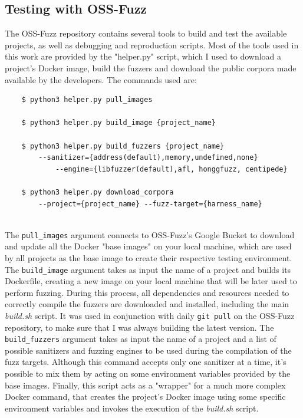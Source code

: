 \subsection{Testing with OSS-Fuzz}
The OSS-Fuzz repository contains several tools to build and test the available projects, as well as debugging and reproduction scripts.
\newline
Most of the tools used in this work are provided by the "helper.py" script, which I used to download a project's Docker image, build the fuzzers and download the public corpora made available by the developers.
\newline \newline
The commands used are:
\begin{verbatim}
    $ python3 helper.py pull_images 

    $ python3 helper.py build_image {project_name}

    $ python3 helper.py build_fuzzers {project_name}
        --sanitizer={address(default),memory,undefined,none} 
            --engine={libfuzzer(default),afl, honggfuzz, centipede}
        
    $ python3 helper.py download_corpora 
        --project={project_name} --fuzz-target={harness_name}
\end{verbatim}
\ \\
The \verb|pull_images| argument connects to OSS-Fuzz's Google Bucket to download and update all the Docker "base images" on your local machine, which are used by all projects as the base image to create their respective testing environment.
\newline \newline
The \verb|build_image| argument takes as input the name of a project and builds its Dockerfile, creating a new image on your local machine that will be later used to perform fuzzing. During this process, all dependencies and resources needed to correctly compile the fuzzers are downloaded and installed, including the main \textit{build.sh} script. It was used in conjunction with daily \verb|git pull| on the OSS-Fuzz repository, to make sure that I was always building the latest version. 
\newline \newline
The \verb|build_fuzzers| argument takes as input the name of a project and a list of possible sanitizers and fuzzing engines to be used during the compilation of the fuzz targets. Although this command accepts only one sanitizer at a time, it's possible to mix them by acting on some environment variables provided by the base images. Finally, this script acts as a "wrapper" for a much more complex Docker command, that creates the project's Docker image using some specific environment variables and invokes the execution of the \textit{build.sh} script.
